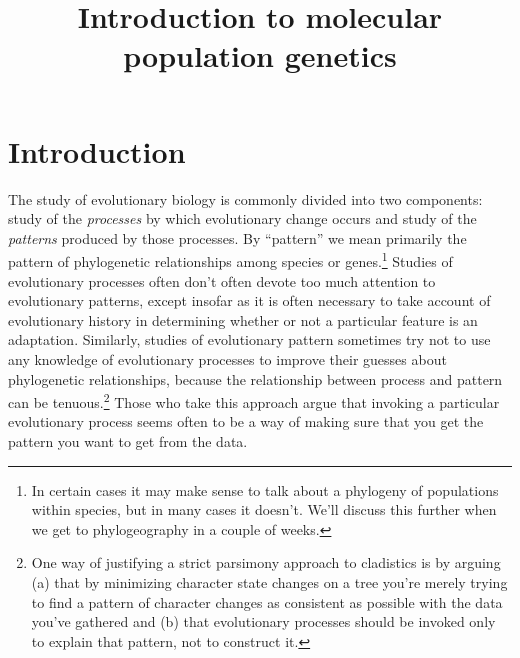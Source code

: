 \documentclass[12pt]{article}
\title{Introduction to molecular population genetics}
\begin{document}
\maketitle

\thispagestyle{first}

\section*{Introduction}

The study of evolutionary biology is commonly divided into two
components: study of the {\it processes\/} by which evolutionary
change occurs and study of the {\it patterns\/} produced by those
processes. By ``pattern'' we mean primarily the pattern of
phylogenetic relationships among species or genes.\footnote{In certain
  cases it may make sense to talk about a phylogeny of populations
  within species, but in many cases it doesn't. We'll discuss this
  further when we get to phylogeography in a couple of weeks.} Studies
of evolutionary processes often don't often devote too much attention
to evolutionary patterns, except insofar as it is often necessary to
take account of evolutionary history in determining whether or not a
particular feature is an adaptation. Similarly, studies of
evolutionary pattern sometimes try not to use any knowledge of
evolutionary processes to improve their guesses about phylogenetic
relationships, because the relationship between process and pattern
can be tenuous.\footnote{One way of justifying a strict parsimony
  approach to cladistics is by arguing (a) that by minimizing
  character state changes on a tree you're merely trying to find a
  pattern of character changes as consistent as possible with the data
  you've gathered and (b) that evolutionary processes should be
  invoked only to explain that pattern, not to construct it.} Those
who take this approach argue that invoking a particular evolutionary
process seems often to be a way of making sure that you get the
pattern you want to get from the data.
\end{document}
